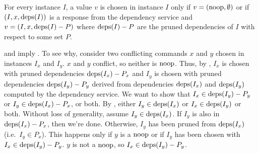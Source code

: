 \begin{invariant}
  For every instance $I$, a value $v$ is chosen in instance $I$ only if $v =
  (\text{noop}, \emptyset)$ or if $(I, x, \text{deps}(I))$ is a response from the
  dependency service and $v = (I, x, \text{deps}(I) - P)$ where $\text{deps}(I) - P$ are
  the pruned dependencies of $I$ with respect to some set $P$.
\end{invariant}

 and  imply
. To see why, consider two conflicting commands $x$
and $y$ chosen in instances $I_x$ and $I_y$. $x$ and $y$ conflict, so neither
is $\text{noop}$. Thus, by , $I_x$ is chosen with pruned
dependencies $\text{deps}(I_x) - P_x$ and $I_y$ is chosen with pruned dependencies
$\text{deps}(I_y) - P_y$ derived from dependencies $\text{deps}(I_x)$ and $\text{deps}(I_y)$
computed by the dependency service. We want to show that $I_x \in \text{deps}(I_y) -
P_y$ or $I_y \in \text{deps}(I_x) - P_x$, or both.
%
By , either $I_y \in \text{deps}(I_x)$ or $I_x \in
\text{deps}(I_y)$ or both. Without loss of generality, assume $I_y \in \text{deps}(I_x)$.
If $I_y$ is also in $\text{deps}(I_x) - P_x$, then we're done. Otherwise, $I_y$ has
been pruned from $\text{deps}(I_x)$ (i.e.\ $I_y \in P_x$). This happens only if $y$
is a $\text{noop}$ or if $I_y$ has been chosen with $I_x \in \text{deps}(I_y) - P_y$. $y$
is not a $\text{noop}$, so $I_x \in \text{deps}(I_y) - P_y$.

